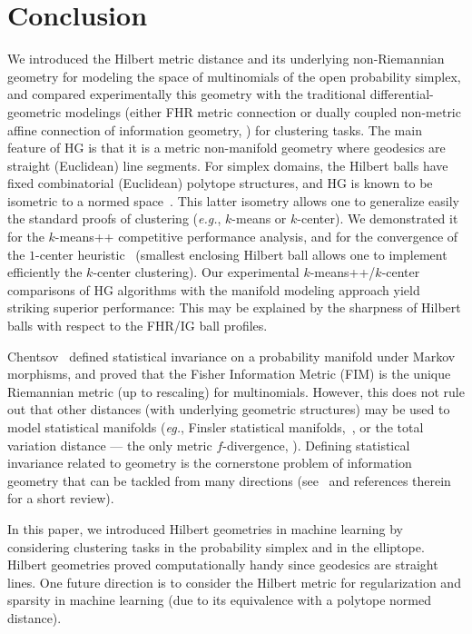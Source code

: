 \documentclass[graybox]{svmult}
\begin{document}
\section{Conclusion}\label{sec:con}
We introduced the Hilbert metric distance and its underlying non-Riemannian geometry for modeling the space of multinomials of the open probability simplex, 
and compared experimentally this geometry with the 
traditional differential-geometric modelings (either FHR metric connection or dually coupled non-metric affine connection of information geometry, \cite{IG-2016}) for clustering tasks.
The main feature of HG is that it is a metric non-manifold geometry where geodesics are straight (Euclidean) line segments.
For simplex domains, the Hilbert balls have fixed combinatorial (Euclidean) polytope structures, and HG is known to be isometric to a normed space~\cite{HilbertHarpe-1991,HilbertNormedSpace-2005}.
This latter isometry allows one to generalize easily the standard proofs of clustering ({\it e.g.}, $k$-means or $k$-center).
We demonstrated it for the $k$-means++ competitive performance analysis, and for the convergence of the $1$-center heuristic~\cite{bc-2003} (smallest enclosing Hilbert ball allows one to implement efficiently the $k$-center clustering).
Our experimental  $k$-means++/$k$-center comparisons of HG algorithms with the  manifold modeling approach  yield striking superior performance:
This may be explained by the sharpness of Hilbert balls with respect to the FHR/IG ball profiles.

Chentsov~\cite{cencov-2000} defined statistical invariance on a probability manifold under Markov morphisms, and proved that the Fisher Information Metric (FIM) is the unique Riemannian metric (up to rescaling) for multinomials. However, this does not rule out that other distances (with underlying geometric structures) may be used to model statistical manifolds ({\it eg.}, Finsler statistical manifolds,~\cite{Cena-2002,FinslerIG-2016}, or the total variation distance --- the only metric $f$-divergence, \cite{L1metricfdiv-2007}). Defining statistical invariance related to geometry is the cornerstone problem of information geometry that can be tackled from many directions (see~\cite{statinvar-2017} and references therein for a short review). 

In this paper, we introduced Hilbert geometries in machine learning by considering clustering tasks in the probability simplex and in the elliptope.
Hilbert geometries proved computationally handy since geodesics are straight lines. 
One future direction is to consider the Hilbert metric for regularization and sparsity in machine learning (due to its equivalence with a polytope normed distance).
\vskip 0.5cm
\end{document}
